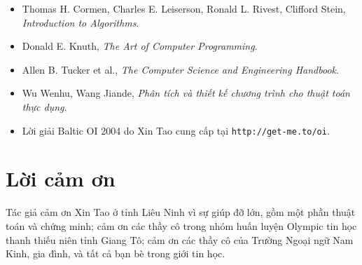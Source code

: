 \documentclass[11pt]{article}
\begin{document}
\begin{itemize}
  \item Thomas H. Cormen, Charles E. Leiserson, Ronald L. Rivest, Clifford
  Stein, \textit{Introduction to Algorithms}.
  \item Donald E. Knuth, \textit{The Art of Computer Programming}.
  \item Allen B. Tucker et al., \textit{The Computer Science and Engineering
  Handbook}.
  \item Wu Wenhu, Wang Jiande, \textit{Phân tích và thiết kế chương trình cho
  thuật toán thực dụng}.
  \item Lời giải Baltic OI 2004 do Xin Tao cung cấp tại \texttt{http://get-me.to/oi}.
\end{itemize}

\section*{Lời cảm ơn}

Tác giả cảm ơn Xin Tao ở tỉnh Liêu Ninh vì sự giúp đỡ lớn, gồm một phần thuật
toán và chứng minh; cảm ơn các thầy cô trong nhóm huấn luyện Olympic tin học
thanh thiếu niên tỉnh Giang Tô; cảm ơn các thầy cô của Trường Ngoại ngữ Nam
Kinh, gia đình, và tất cả bạn bè trong giới tin học.
\end{document}
